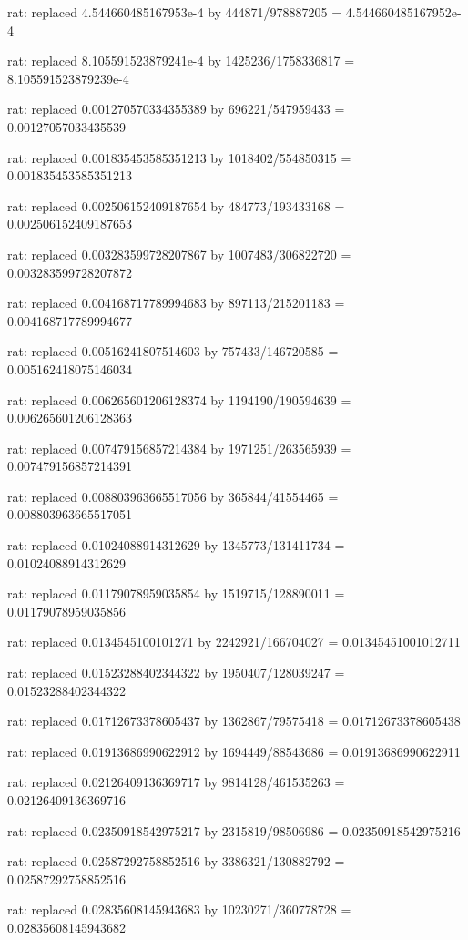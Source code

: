 \documentclass[a4paper,10pt]{article}
\begin{document}
\begin{eulernotebook}
\begin{eulercomment}
\begin{eulercomment}
\begin{eulercomment}
\begin{eulercomment}
\begin{eulercomment}
\begin{eulercomment}
\begin{eulercomment}
\begin{eulercomment}
\begin{eulercomment}
\begin{eulercomment}
\begin{eulercomment}
\begin{eulercomment}
\begin{eulercomment}
\begin{eulercomment}
\begin{eulercomment}
\begin{eulercomment}
\begin{euleroutput}
  rat: replaced 4.544660485167953e-4 by 444871/978887205 = 4.544660485167952e-4
  
  rat: replaced 8.105591523879241e-4 by 1425236/1758336817 = 8.105591523879239e-4
  
  rat: replaced 0.001270570334355389 by 696221/547959433 = 0.00127057033435539
  
  rat: replaced 0.001835453585351213 by 1018402/554850315 = 0.001835453585351213
  
  rat: replaced 0.002506152409187654 by 484773/193433168 = 0.002506152409187653
  
  rat: replaced 0.003283599728207867 by 1007483/306822720 = 0.003283599728207872
  
  rat: replaced 0.004168717789994683 by 897113/215201183 = 0.004168717789994677
  
  rat: replaced 0.00516241807514603 by 757433/146720585 = 0.005162418075146034
  
  rat: replaced 0.006265601206128374 by 1194190/190594639 = 0.006265601206128363
  
  rat: replaced 0.007479156857214384 by 1971251/263565939 = 0.007479156857214391
  
  rat: replaced 0.008803963665517056 by 365844/41554465 = 0.008803963665517051
  
  rat: replaced 0.01024088914312629 by 1345773/131411734 = 0.01024088914312629
  
  rat: replaced 0.01179078959035854 by 1519715/128890011 = 0.01179078959035856
  
  rat: replaced 0.0134545100101271 by 2242921/166704027 = 0.01345451001012711
  
  rat: replaced 0.01523288402344322 by 1950407/128039247 = 0.01523288402344322
  
  rat: replaced 0.01712673378605437 by 1362867/79575418 = 0.01712673378605438
  
  rat: replaced 0.01913686990622912 by 1694449/88543686 = 0.01913686990622911
  
  rat: replaced 0.02126409136369717 by 9814128/461535263 = 0.02126409136369716
  
  rat: replaced 0.02350918542975217 by 2315819/98506986 = 0.02350918542975216
  
  rat: replaced 0.02587292758852516 by 3386321/130882792 = 0.02587292758852516
  
  rat: replaced 0.02835608145943683 by 10230271/360778728 = 0.02835608145943682
  

\end{euleroutput}
\end{eulercomment}
\end{eulercomment}
\end{eulercomment}
\end{eulercomment}
\end{eulercomment}
\end{eulercomment}
\end{eulercomment}
\end{eulercomment}
\end{eulercomment}
\end{eulercomment}
\end{eulercomment}
\end{eulercomment}
\end{eulercomment}
\end{eulercomment}
\end{eulercomment}
\end{eulercomment}
\end{eulernotebook}
\end{document}
